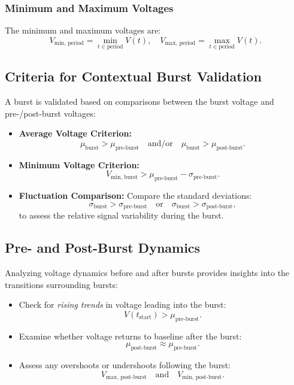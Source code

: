 \documentclass[a4paper,9pt]{extarticle}
\begin{document}
\subsubsection{Minimum and Maximum Voltages}
The minimum and maximum voltages are:
\[
V_{\text{min, period}} = \min_{t \in \text{period}} V(t), \quad V_{\text{max, period}} = \max_{t \in \text{period}} V(t).
\]

\subsection{Criteria for Contextual Burst Validation}
A burst is validated based on comparisons between the burst voltage and pre-/post-burst voltages:
\begin{itemize}
    \item \textbf{Average Voltage Criterion:}
    \[
    \mu_{\text{burst}} > \mu_{\text{pre-burst}} \quad \text{and/or} \quad \mu_{\text{burst}} > \mu_{\text{post-burst}}.
    \]
    \item \textbf{Minimum Voltage Criterion:}
    \[
    V_{\text{min, burst}} > \mu_{\text{pre-burst}} - \sigma_{\text{pre-burst}}.
    \]
    \item \textbf{Fluctuation Comparison:}
    Compare the standard deviations:
    \[
    \sigma_{\text{burst}} > \sigma_{\text{pre-burst}} \quad \text{or} \quad \sigma_{\text{burst}} > \sigma_{\text{post-burst}},
    \]
    to assess the relative signal variability during the burst.
\end{itemize}

\subsection{Pre- and Post-Burst Dynamics}
Analyzing voltage dynamics before and after bursts provides insights into the transitions surrounding bursts:
\begin{itemize}
    \item Check for \emph{rising trends} in voltage leading into the burst:
    \[
    V(t_{\text{start}}) > \mu_{\text{pre-burst}}.
    \]
    \item Examine whether voltage returns to baseline after the burst:
    \[
    \mu_{\text{post-burst}} \approx \mu_{\text{pre-burst}}.
    \]
    \item Assess any overshoots or undershoots following the burst:
    \[
    V_{\text{max, post-burst}} \quad \text{and} \quad V_{\text{min, post-burst}}.
    \]
\end{itemize}
\end{document}

